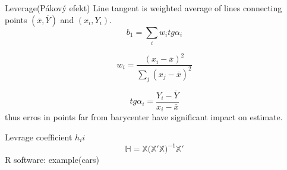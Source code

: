 \documentclass[smaller]{beamer}
\def\tn#1{{\mathbb{#1}}}    %
\def\ol#1{\overline{#1}}
\def\xskip{{\vspace{2ex}}}
\def\cz#1{{\small (#1)}}
\begin{document}
\begin{frame}{Leverage\cz{Pákový efekt}}
Line tangent is weighted average of lines connecting points $(\ol{x},\ol{Y})$  and $(x_i, Y_i)$.
\[
   b_1 =  \sum_i w_i tg \alpha_i
\]

\xskip

\[
    w_i = \frac{(x_i - \ol{x})^2}{\sum_j (x_j - \ol{x})^2}
\]

\xskip

\[
    tg \alpha_i = \frac{Y_i - \ol{Y}}{x_i - \ol{x}}
\]
thus erros in points far from barycenter have significant impact on estimate.

\xskip
Levrage coefficient $h_ii$
\[
    \tn H = \tn X \big( \tn X' \tn X \big)^{-1}\tn X'
\]
\xskip
R software: example(cars)
\end{frame}
\end{document}
